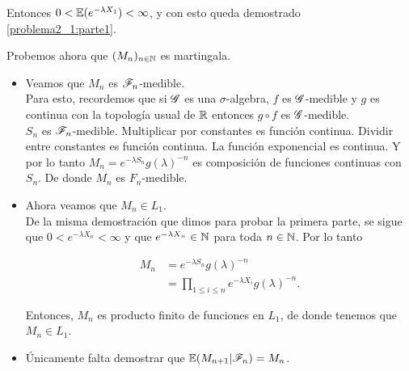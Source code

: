     Entonces $0 < \mathbb{E}(e^{-\lambda X_1}) < \infty$, y con esto queda demostrado \eqref{problema2_1:parte1}.
    
    Probemos ahora que $(M_n)_{n \in \mathbb{N}}$ es martingala.
    
    \begin{itemize}
        \item 
            Veamos que $M_n$ es $\mathscr{F}_n$-medible.\\
            
            Para esto, recordemos que si $\mathscr{G}$ es una $\sigma$-algebra, $f$ es $\mathscr{G}$-medible y $g$ es continua
            con la topología usual de $\mathbb{R}$ entonces $g \circ f$ es $\mathscr{G}$-medible.\\
            
            $S_n$ es $\mathscr{F}_n$-medible. Multiplicar por constantes es función continua. Dividir entre constantes 
            es función continua. La función exponencial es continua. Y por lo tanto $M_n=e^{-\lambda S_n}g(\lambda)^{-n}$ 
            es composición de funciones continuas con $S_n$. De donde $M_n$ es $F_n$-medible.\\
         
        \item 
            Ahora veamos que $M_n \in L_1$.\\
            
            De la misma demostración que dimos para probar la primera parte, se sigue 
            que $0 < e^{-\lambda X_n} < \infty$ y que $e^{-\lambda X_n} \in \mathbb{N}$ para toda $n \in \mathbb{N}$. Por lo tanto
            
            \begin{align}
                M_n         &=      e^{-\lambda S_n}g(\lambda)^{-n} \\
                            &=      \prod_{1 \leq i \leq n} e^{-\lambda X_i} g(\lambda)^{-n}. 
            \end{align}
            
            Entonces, $M_n$ es producto finito de funciones en $L_1$, de donde tenemos que $M_n \in L_1$.\\
            
         \item
            Únicamente falta demostrar que $\mathbb{E}(M_{n+1} | \mathscr{F}_n) = M_n$.\\
            

\end{itemize}
